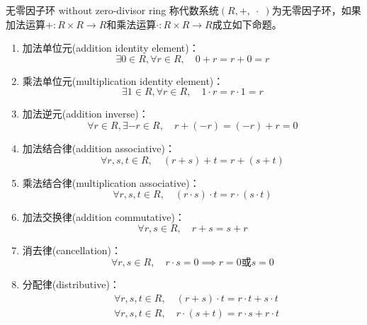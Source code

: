 \begin{definition}{无零因子环 without zero-divisor ring}
	称代数系统$(R,+,\;\cdot\;)$为无零因子环，如果加法运算$+:R\times R\to R$和乘法运算$\cdot :R\times R\to R$成立如下命题。
	\begin{enumerate}
		\item 加法单位元(addition identity element)：
		$$
		\exists 0\in R,\forall r\in R,\quad 0+r=r+0=r
		$$
		\item 乘法单位元(multiplication identity element)：
		$$
		\exists 1\in R,\forall r\in R,\quad 1\cdot r=r\cdot 1=r
		$$
		\item 加法逆元(addition inverse)：
		$$
		\forall r\in R,\exists-r\in R,\quad r+(-r)=(-r)+r=0
		$$
		\item 加法结合律(addition associative)：
		$$
		\forall r,s,t\in R,\quad (r+s)+t=r+(s+t)
		$$
		\item 乘法结合律(multiplication associative)：
		$$
		\forall r,s,t\in R,\quad (r\cdot s)\cdot t=r\cdot (s\cdot t)
		$$
		\item 加法交换律(addition commutative)：
		$$
		\forall r,s\in R,\quad r+s=s+r
		$$
		\item 消去律(cancellation)：
		$$
		\forall r,s\in R,\quad r\cdot s=0\implies r=0\text{或}s=0
		$$
		\item 分配律(distributive)：
		\begin{align*}
			&\forall r,s,t\in R,\quad (r+s)\cdot t=r\cdot t+s\cdot t\\
			&\forall r,s,t\in R,\quad r\cdot(s+t)=r\cdot s+r\cdot t
		\end{align*}
	\end{enumerate}
\end{definition}

